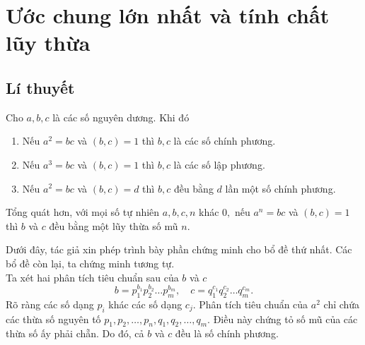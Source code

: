 \section{Ước chung lớn nhất và tính chất lũy thừa}

\subsection*{Lí thuyết}
\begin{light}
 Cho $a,b,c$ là các số nguyên dương. Khi đó
    \begin{enumerate}
        \item  Nếu $a^{2}=bc$ và $(b,c)=1$  thì $b, c$ là các số chính phương.  
        \item  Nếu $a^{3}=bc$ và $(b,c)=1$  thì $b, c$ là các số lập phương.  
        \item  Nếu $a^{2}=bc$ và $(b,c)=d$  thì $b, c$ đều bằng $d$ lần một số chính phương.
    \end{enumerate}
    Tổng quát hơn, với mọi số tự nhiên $a,b,c,n$ khác $0,$ nếu $a^n=bc$ và $(b,c)=1$ thì $b$ và $c$ đều bằng một lũy thừa số mũ $n.$
\end{light}
Dưới đây, tác giả xin phép trình bày phần chứng minh cho bổ đề thứ nhất. Các bổ đề còn lại, ta chứng minh tương tự. \\
 Ta xét hai phân tích tiêu chuẩn sau của $b$ và $c$
$$b=p_1^{b_1}p_2^{b_2}\ldots p_m^{b_m},\quad c=q_1^{c_1}q_2^{c_2}\ldots q_m^{c_m}.$$
Rõ ràng các số dạng $p_i$ khác các số dạng $c_j.$ Phân tích tiêu chuẩn của $a^2$ chỉ chứa các thừa số nguyên tố $p_1,p_2,\ldots,p_n,q_1,q_2,\ldots,q_m.$ Điều này chứng tỏ số mũ của các thừa số ấy phải chẵn. Do đó, cả $b$ và $c$ đều là số chính phương.

